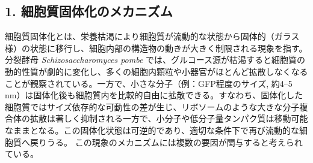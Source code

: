 \subsection{1. 細胞質固体化のメカニズム}
細胞質固体化とは、栄養枯渇により細胞質が流動的な状態から固体的（ガラス様）の状態に移行し、細胞内部の構造物の動きが大きく制限される現象を指す。分裂酵母 \textit{Schizosaccharomyces pombe} では、グルコース源が枯渇すると細胞質の動的性質が劇的に変化し、多くの細胞内顆粒や小器官がほとんど拡散しなくなることが観察されている。一方で、小さな分子（例：GFP程度のサイズ, 約4–5 nm）は固体化後も細胞質内を比較的自由に拡散できる。すなわち、固体化した細胞質ではサイズ依存的な可動性の差が生じ、リボソームのような大きな分子複合体の拡散は著しく抑制される一方で、小分子や低分子量タンパク質は移動可能なままとなる。この固体化状態は可逆的であり、適切な条件下で再び流動的な細胞質へ戻りうる。
この現象のメカニズムには複数の要因が関与すると考えられている。
